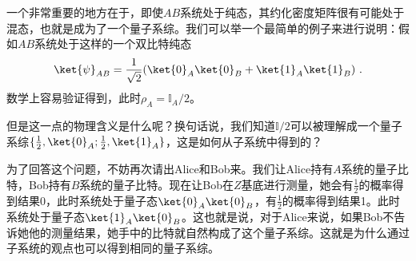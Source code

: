一个非常重要的地方在于，即使$AB$系统处于纯态，其约化密度矩阵很有可能处于混态，也就是成为了一个量子系综。我们可以举一个最简单的例子来进行说明：假如$AB$系统处于这样的一个双比特纯态
\begin{equation}
\ket{\psi}_{AB}=\frac{1}{\sqrt{2}}(\ket{0}_A\ket{0}_B+\ket{1}_A\ket{1}_B)~.
\end{equation}
数学上容易验证得到，此时$\rho_A=\mathbb{I}_A/2$。

但是这一点的物理含义是什么呢？换句话说，我们知道$\mathbb{I}/2$可以被理解成一个量子系综$\{\frac{1}{2},\ket{0}_A;\frac{1}{2},\ket{1}_A\}$，这是如何从子系统中得到的？

为了回答这个问题，不妨再次请出Alice和Bob来。我们让Alice持有$A$系统的量子比特，Bob持有$B$系统的量子比特。现在让Bob在$Z$基底进行测量，她会有$\frac{1}{2}$的概率得到结果0，此时系统处于量子态$\ket{0}_A\ket{0}_B$，有$\frac{1}{2}$的概率得到结果1。此时系统处于量子态$\ket{1}_A\ket{0}_B$。这也就是说，对于Alice来说，如果Bob不告诉她他的测量结果，她手中的比特就自然构成了这个量子系综。这就是为什么通过子系统的观点也可以得到相同的量子系综。




